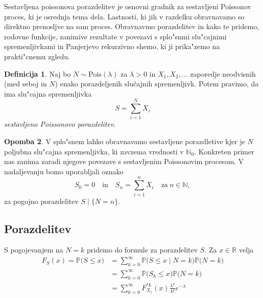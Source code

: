 \documentclass[12pt, a4paper, reqno]{amsart}
\theoremstyle{definition}
\newtheorem{definicija}{Definicija}[section]
\newtheorem{opomba}[definicija]{Opomba}
\theoremstyle{plain}
\newcommand{\R}{\mathbb{R}}
\newcommand{\N}{\mathbb{N}}
\newcommand{\Prob}{\mathbb{P}}
\newcommand{\1}{\mathds{1}}
\newcommand{\Pois}[1]{\text{Pois}(#1)}
\begin{document}
    Sestavljena poissonova porazdelitev je osnovni gradnik za sestavljeni Poissonov proces, ki je osrednja 
    tema dela. Lastnosti, ki jih v razdelku obravnavamo so direktno prenosljve na sam proces. Obravnavmo 
    porazdelitev in kako te pridemo, rodovne funkcije, zanimive rezultate v povezavi s 
    splo"snmi slu"cajnimi spremenljivkami in Panjerjevo rekurzivno shemo, ki ji prika"zemo na 
    prakti"cnemu zgledu.

    \begin{definicija}
        Naj bo $N\sim \Pois{\lambda}$  za $\lambda >0$ in $X_1, X_2, \dots$ zaporedje neodvisnih (med seboj in $N$)
        enako porazdeljenih slučajnih spremenljivk. Potem pravimo, da ima slu"cajna spremenljivka
        \begin{equation*}
            S = \sum_{i=1}^NX_i
        \end{equation*}
        \textit{sestavljeno Poissonovo porazdelitev}. 
        \label{def:sestavljenaPoissonovaPorazdelitev}
    \end{definicija}

    \begin{opomba}
        V splo"snem lahko obravnavamo sestavljene porazdletive kjer je $N$ poljubna slu"cajna spremenljivka,
        ki zavzema vrednosti v $\N_0$. Konkreten primer nas zanima zaradi njegove povezave s sestavljenim
        Poissonovim procesom. V nadaljevanju bomo uporabljali oznako
        \begin{equation*}
            S_0 = 0 \quad \text{in} \quad S_n = \sum_{i=1}^nX_i \quad \text{za} \ n\in\N, 
        \end{equation*}
        za pogojno porazdelitev $S\mid\{N = n\}$.
        \label{op:gneralCaseCOmpound}
    \end{opomba}

    \subsection{Porazdelitev}
    S pogojevanjem na $N = k$ pridemo do formule za porazdelitev $S$. Za $x \in \R$ velja 
    \begin{align*}
        F_{S}(x) = \Prob\bigl(S \leq x\bigr) 
        &= \sum_{k=0}^\infty \Prob\bigl(S \leq x \mid N = k\bigr)\Prob\bigl(N = k\bigr) \\
        &= \sum_{k=0}^\infty \Prob\bigl(S_k \leq x\bigr)\Prob\bigl(N = k\bigr) \\
        &= \sum_{k=0}^\infty F_{X_1}^{*k}(x) \frac{\lambda^k}{k!} e^{-\lambda}
    \end{align*}
\end{document}
